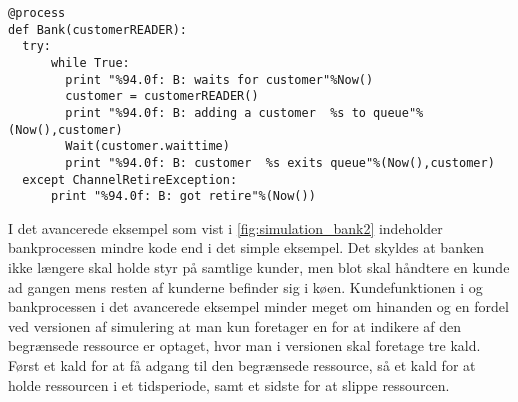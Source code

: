 \begin{lstlisting}[firstnumber=33 ,float=hbtp, label=fig:simulation_bank2, caption=Bankprocessen hvor banken er en begrænset ressource. ]
  @process
def Bank(customerREADER):
  try:
      while True:
        print "%94.0f: B: waits for customer"%Now()
        customer = customerREADER()
        print "%94.0f: B: adding a customer  %s to queue"%(Now(),customer)
        Wait(customer.waittime)
        print "%94.0f: B: customer  %s exits queue"%(Now(),customer)
  except ChannelRetireException:
      print "%94.0f: B: got retire"%(Now())

\end{lstlisting}
I det avancerede eksempel som vist i  \cref{fig:simulation_bank2} indeholder bankprocessen mindre kode end i det simple eksempel. Det skyldes at banken ikke længere skal holde styr på samtlige kunder, men blot skal håndtere en kunde ad gangen mens resten af kunderne befinder sig i køen. Kundefunktionen i \simpy og bankprocessen i det avancerede eksempel minder meget om hinanden og en fordel ved \csp versionen af simulering at man kun foretager en  for at indikere af den begrænsede ressource er optaget, hvor man i \simpy versionen skal foretage tre kald. Først et kald for at få adgang til den begrænsede ressource, så et kald for at holde ressourcen i et tidsperiode, samt et sidste for at slippe ressourcen.

  
